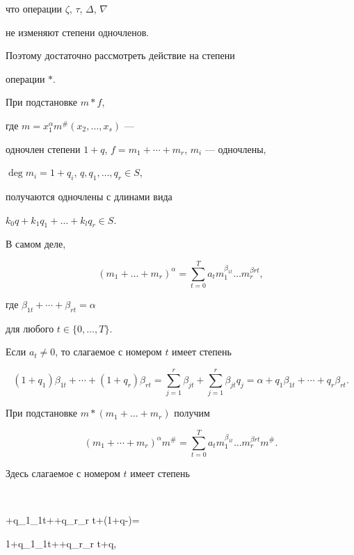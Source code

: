 что операции $\zeta$, $\tau$, $\Delta$, $\nabla$


не изменяют степени одночленов.


Поэтому достаточно рассмотреть действие на степени


операции $*$.





При подстановке $m*f$, 


где $m=x_1^{\alpha}m^{\#}(x_2,\dotsc,x_s)$ ---


одночлен степени $1+q$, $f=m_{1}+\dotsb +m_{r}$, $m_{i}$ --- одночлены,


$\deg m_{i}=1+{q_i}$, $q,q_1,\dotsc,q_r\in S$, 


получаются одночлены с длинами вида 


${k_0 q}+{k_1 q_1}+\dotsc +{k_l q_r}\in S$.


В самом деле,


$$


(m_{1}+\dotsc +m_{r})^{\alpha}=


\sum_{t=0}^T a_t m_{1}^{\beta _{1t}}\dotsc m_{r}^{\beta {r t}},


$$


где $\beta _{1t}+\dotsb +\beta _{r t}=\alpha$


для любого $t\in\{0,\dotsc,T\}$.


Если $a_t\ne 0$, то слагаемое с номером $t$ имеет степень


$$


(1+q_1)\beta _{1t}+\dotsb +(1+q_r)\beta _{r t}=


\sum_{j=1}^{r}\beta _{jt}+\sum_{j=1}^{r}\beta _{jt}q_j=


\alpha+q_1\beta _{1t}+\dotsb +q_r\beta _{r t}.


$$


При подстановке $m*(m_{1}+\dotsc +m_{r})$ получим


$$


(m_{1}+\dotsb +m_{r})^{\alpha}m^{\#}=


\sum_{t=0}^T a_t m_{1}^{\beta _{1t}}\dotsc


m_{r}^{\beta {r t}}m^{\#}.


$$


Здесь слагаемое с номером $t$ имеет степень


$$


\alpha +q_1\beta _{1t}+\dotsb +q_r\beta _{r t}+(1+q-\alpha)=


1+q_1\beta _{1t}+\dotsb +q_r\beta _{r t}+q,


